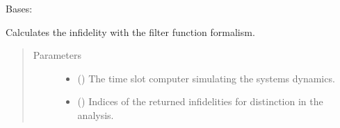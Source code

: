 \documentclass[letterpaper,10pt,english]{sphinxmanual}
\begin{document}
\begin{fulllineitems}
\label{\detokenize{qsim:qsim.cost_functions.OperatorFilterFunctionInfidelity}}
Bases: {\hyperref[\detokenize{qsim:qsim.cost_functions.CostFunction}]{}}

Calculates the infidelity with the filter function formalism.
\begin{quote}\begin{description}
\item[{Parameters}] \leavevmode\begin{itemize}
\item {} 
 () \textendash{} The time slot computer simulating the systems dynamics.

\item {} 
 () \textendash{} Indices of the returned infidelities for distinction in the analysis.


\end{itemize}
\end{description}
\end{quote}
\end{fulllineitems}
\end{document}
